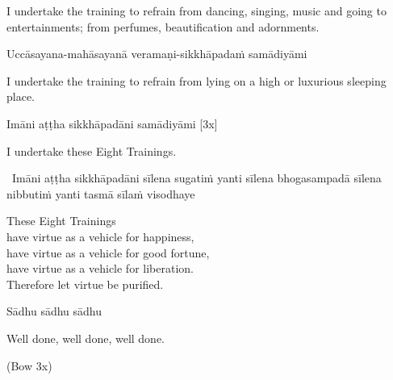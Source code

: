 \begin{english-hang}
  I undertake the training to refrain from dancing, singing, music and going to entertainments; from perfumes, beautification and adornments.\hyperlink{endnote143-appendix}{\hypertarget{endnote143-body}{}}
\end{english-hang}

Uccāsayana-mahāsayanā veramaṇi-sikkhāpadaṁ samādiyāmi

\begin{english-hang}
  I undertake the training to refrain from lying on a high or luxurious sleeping place.
\end{english-hang}

Imāni aṭṭha sikkhāpadāni samādiyāmi \hfill{[3x]}

\begin{english}
  I undertake these Eight Trainings.
\end{english}

\begin{leader-only}
  \anglebracketleft\ \hspace{-0.5mm}Imāni aṭṭha sikkhāpadāni sīlena sugatiṁ yanti sīlena bhogasampadā sīlena nibbutiṁ yanti tasmā sīlaṁ visodhaye \hspace{-0.5mm}\anglebracketright\
\end{leader-only}

\begin{english-verses}
  These Eight Trainings\\
  have virtue as a vehicle for happiness,\\
  have virtue as a vehicle for good fortune,\\
  have virtue as a vehicle for liberation.\\
  Therefore let virtue be purified.\hyperlink{endnote144-appendix}{\hypertarget{endnote144-body}{}}
\end{english-verses}

Sādhu sādhu sādhu

\begin{english}
  Well done, well done, well done.
\end{english}

\begin{center}
  (Bow 3x)
\end{center}

\clearpage
